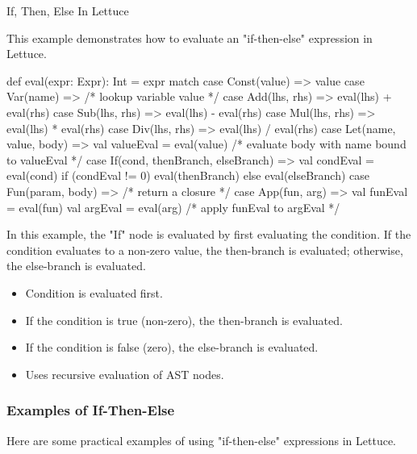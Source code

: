 \begin{notes}{If, Then, Else In Lettuce}
\begin{highlight}
        This example demonstrates how to evaluate an "if-then-else" expression in Lettuce.
    
    \begin{code}[Scala]
    def eval(expr: Expr): Int = expr match {
        case Const(value) => value
        case Var(name) => /* lookup variable value */
        case Add(lhs, rhs) => eval(lhs) + eval(rhs)
        case Sub(lhs, rhs) => eval(lhs) - eval(rhs)
        case Mul(lhs, rhs) => eval(lhs) * eval(rhs)
        case Div(lhs, rhs) => eval(lhs) / eval(rhs)
        case Let(name, value, body) => 
            val valueEval = eval(value)
            /* evaluate body with name bound to valueEval */
        case If(cond, thenBranch, elseBranch) => 
            val condEval = eval(cond)
            if (condEval != 0) eval(thenBranch) else eval(elseBranch)
        case Fun(param, body) => /* return a closure */
        case App(fun, arg) => 
            val funEval = eval(fun)
            val argEval = eval(arg)
            /* apply funEval to argEval */
    }
    \end{code}
    
        In this example, the "If" node is evaluated by first evaluating the condition. If the condition evaluates to a non-zero value, the then-branch is evaluated; otherwise, the else-branch is evaluated.
    
        \begin{itemize}
            \item Condition is evaluated first.
            \item If the condition is true (non-zero), the then-branch is evaluated.
            \item If the condition is false (zero), the else-branch is evaluated.
            \item Uses recursive evaluation of AST nodes.
        \end{itemize}
    
    \end{highlight}
    
    \subsubsection*{Examples of If-Then-Else}
    
    Here are some practical examples of using "if-then-else" expressions in Lettuce.
    
    \begin{highlight}
    

\end{highlight}
\end{notes}
